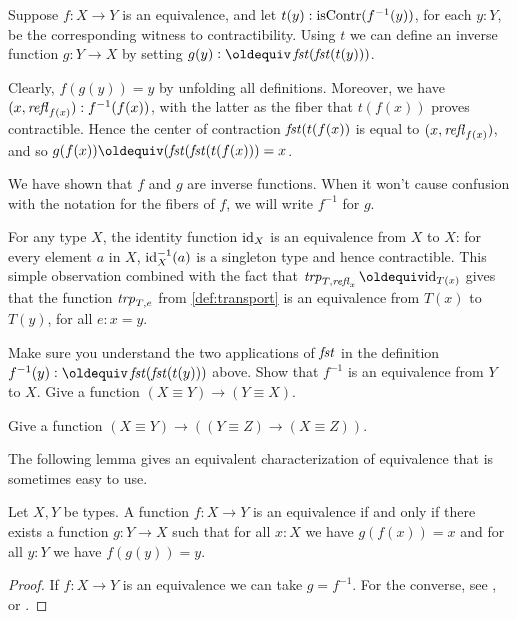 Suppose $f:X \to Y$ is an equivalence, and let $t(y): \mathrm{isContr}(f^{-1}(y))$, for each $y:Y$, be the corresponding witness to contractibility.
Using $t$ we can define an inverse function $g : Y \to X$ by setting $g(y)\defeq\fst(\fst(t(y)))$.

Clearly, $f(g(y)) = y$ by unfolding all definitions.
Moreover, we have $(x,\mathop{{\it refl}_{f(x)}}) : f^{-1}(f(x))$,
with the latter as the fiber that $t(f(x))$
proves contractible. Hence the center of contraction
$\mathop{\mathit{fst}}(t(f(x))$ is equal to $(x,\mathop{{\it refl}_{f(x)}})$, and so
$g(f(x))\jdeq(\fst(\fst(t(f(x))) = x$.

We have shown that $f$ and $g$ are inverse functions.  When it won't cause confusion with the notation for the fibers of $f$, we will write
$f^{-1}$ for $g$.

For any type $X$, the identity function $\mathord{\mathrm{id}}_X$ is an
equivalence from $X$ to $X$: for every element $a$ in $X$,
$\mathord{\mathrm{id}}_X^{-1}(a)$ is a singleton type and hence contractible.
This simple observation combined with the fact that
$\trp{T,\refl{x}}\jdeq \id_{T(x)}$ gives that
the function $\mathop{\mathit{trp}_{T,e}}$ from \cref{def:transport}
is an equivalence from $T(x)$ to $T(y)$, for all $e: x=y$.

\begin{xca}\label{xca:equivalence-invers}
Make sure you understand the two applications of $\mathop{\mathit{fst}}$
in the definition $f^{-1}(y)\defeq\fst(\fst(t(y)))$ above.
Show that $f^{-1}$ is an equivalence from $Y$ to $X$.
Give a function $(X\equiv Y) \to (Y\equiv X)$.
\end{xca}

\begin{xca}\label{xca:equivalence-comp}
Give  a function $(X\equiv Y) \to ((Y\equiv Z) \to (X\equiv Z))$.
\end{xca}

The following lemma gives an equivalent characterization
of equivalence that is sometimes easy to use.

\begin{lemma}\label{lem:weq-iso}
Let $X,Y$ be types. A function $f: X\to Y$ is an equivalence
if and only if there exists a function $g: Y\to X$ such that
for all $x:X$ we have $g(f(x))=x$ and for all 
$y:Y$ we have $f(g(y))=y$.
\end{lemma}
\begin{proof}
If $f: X\to Y$ is an equivalence we can take $g=f^{-1}$.
For the converse, see
\cite[Chapter 4]{hottbook}, or .
\end{proof}

